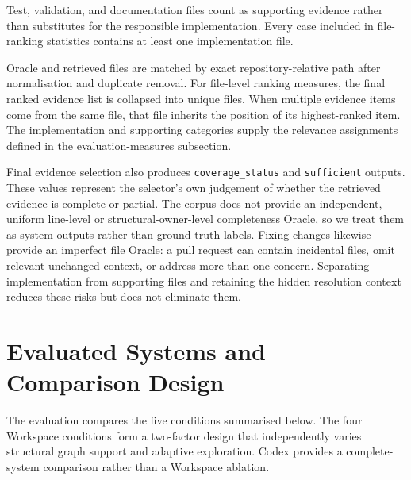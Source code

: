 Test, validation, and documentation files count as supporting evidence rather than substitutes for the responsible implementation. Every case included in file-ranking statistics contains at least one implementation file.

Oracle and retrieved files are matched by exact repository-relative path after normalisation and duplicate removal. For file-level ranking measures, the final ranked evidence list is collapsed into unique files. When multiple evidence items come from the same file, that file inherits the position of its highest-ranked item. The implementation and supporting categories supply the relevance assignments defined in the evaluation-measures subsection.

Final evidence selection also produces \texttt{coverage\_status} and \texttt{sufficient} outputs. These values represent the selector's own judgement of whether the retrieved evidence is complete or partial. The corpus does not provide an independent, uniform line-level or structural-owner-level completeness Oracle, so we treat them as system outputs rather than ground-truth labels. Fixing changes likewise provide an imperfect file Oracle: a pull request can contain incidental files, omit relevant unchanged context, or address more than one concern. Separating implementation from supporting files and retaining the hidden resolution context reduces these risks but does not eliminate them.

\section{Evaluated Systems and Comparison Design}\label{sec:evaluated-systems-and-comparison-design}

The evaluation compares the five conditions summarised below. The four Workspace conditions form a two-factor design that independently varies structural graph support and adaptive exploration. Codex provides a complete-system comparison rather than a Workspace ablation.

